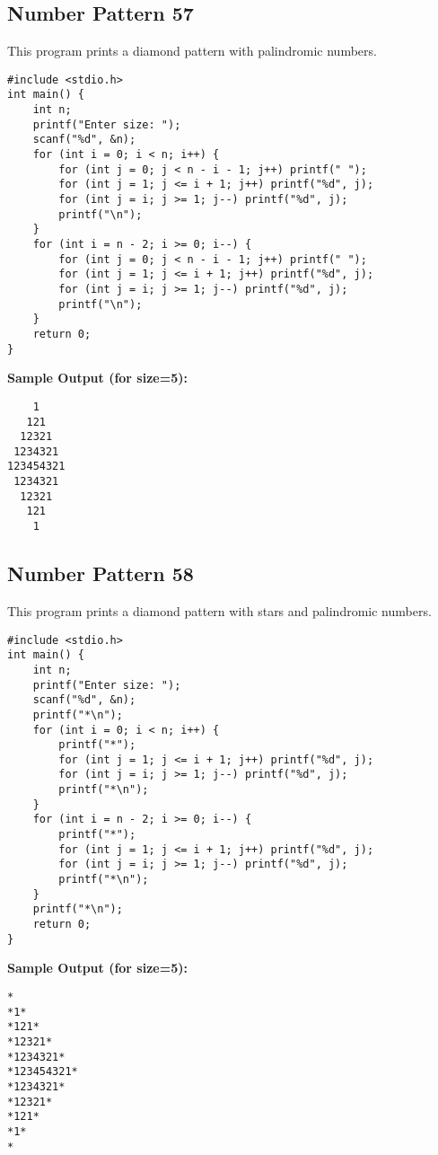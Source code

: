 \documentclass[a4paper,12pt]{article}
\begin{document}
\subsection{Number Pattern 57}
This program prints a diamond pattern with palindromic numbers.
\begin{lstlisting}[caption={Number Pattern 57}]
#include <stdio.h>
int main() {
    int n;
    printf("Enter size: ");
    scanf("%d", &n);
    for (int i = 0; i < n; i++) {
        for (int j = 0; j < n - i - 1; j++) printf(" ");
        for (int j = 1; j <= i + 1; j++) printf("%d", j);
        for (int j = i; j >= 1; j--) printf("%d", j);
        printf("\n");
    }
    for (int i = n - 2; i >= 0; i--) {
        for (int j = 0; j < n - i - 1; j++) printf(" ");
        for (int j = 1; j <= i + 1; j++) printf("%d", j);
        for (int j = i; j >= 1; j--) printf("%d", j);
        printf("\n");
    }
    return 0;
}
\end{lstlisting}
\textbf{Sample Output (for size=5):}
\begin{verbatim}
    1
   121
  12321
 1234321
123454321
 1234321
  12321
   121
    1
\end{verbatim}
\clearpage

\subsection{Number Pattern 58}
This program prints a diamond pattern with stars and palindromic numbers.
\begin{lstlisting}[caption={Number Pattern 58}]
#include <stdio.h>
int main() {
    int n;
    printf("Enter size: ");
    scanf("%d", &n);
    printf("*\n");
    for (int i = 0; i < n; i++) {
        printf("*");
        for (int j = 1; j <= i + 1; j++) printf("%d", j);
        for (int j = i; j >= 1; j--) printf("%d", j);
        printf("*\n");
    }
    for (int i = n - 2; i >= 0; i--) {
        printf("*");
        for (int j = 1; j <= i + 1; j++) printf("%d", j);
        for (int j = i; j >= 1; j--) printf("%d", j);
        printf("*\n");
    }
    printf("*\n");
    return 0;
}
\end{lstlisting}
\textbf{Sample Output (for size=5):}
\begin{verbatim}
*
*1*
*121*
*12321*
*1234321*
*123454321*
*1234321*
*12321*
*121*
*1*
*
\end{verbatim}
\clearpage
\end{document}
